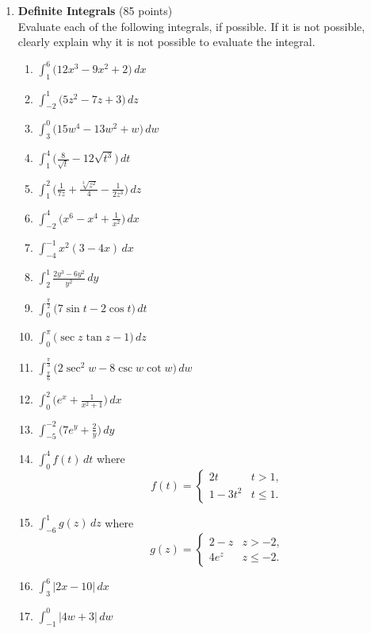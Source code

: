 \begin{enumerate}
  \newpage
  \item \textbf{Definite Integrals} (85 points)\\
  Evaluate each of the following integrals, if possible. If it is not possible, clearly explain why it is not possible to evaluate the integral.
  \begin{enumerate}
    \item $\displaystyle \int_1^6 \bigl(12 x^3 - 9 x^2 + 2\bigr) \,dx$
    \item $\displaystyle \int_{-2}^1 \bigl(5 z^2 - 7 z + 3\bigr) \,dz$
    \item $\displaystyle \int_3^0 \bigl(15 w^4 - 13 w^2 + w\bigr) \,dw$
    \item $\displaystyle \int_1^4 \biggl(\frac{8}{\sqrt{t}} - 12 \sqrt{t^3}\biggr) \,dt$
    \item $\displaystyle \int_1^2 \biggl(\frac{1}{7 z} + \frac{\sqrt[3]{z^2}}{4} - \frac{1}{2 z^3}\biggr) \,dz$
    \item $\displaystyle \int_{-2}^4 \biggl(x^6 - x^4 + \frac{1}{x^2}\biggr) \,dx$
    \item $\displaystyle \int_{-4}^{-1} x^2(3 - 4 x) \,dx$
    \item $\displaystyle \int_2^1 \frac{2 y^3 - 6 y^2}{y^2} \,dy$
    \item $\displaystyle \int_0^{\frac{\pi}{2}} \bigl(7 \sin t - 2 \cos t\bigr) \,dt$
    \item $\displaystyle \int_0^\pi \bigl(\sec z \tan z - 1\bigr) \,dz$
    \item $\displaystyle \int_{\frac{\pi}{6}}^{\frac{\pi}{3}} \bigl(2 \sec^2 w - 8 \csc w \cot w\bigr) \,dw$
    \item $\displaystyle \int_0^2 \biggl(e^x + \frac{1}{x^2 + 1}\biggr) \,dx$
    \item $\displaystyle \int_{-5}^{-2} \biggl(7 e^y + \frac{2}{y}\biggr) \,dy$
    \item $\displaystyle \int_0^4 f(t) \,dt$ where
      \[
        f(t) = \begin{cases}
          2 t & t > 1, \\
          1 - 3 t^2 & t \leq 1.
        \end{cases}
      \]
    \item $\displaystyle \int_{-6}^1 g(z) \,dz$ where
      \[
        g(z) = \begin{cases}
          2 - z & z > -2, \\
          4 e^z & z \leq -2.
        \end{cases}
      \]
    \item $\displaystyle \int_3^6 |2 x - 10| \,dx$
    \item $\displaystyle \int_{-1}^0 |4 w + 3| \,dw$
  \end{enumerate}


\end{enumerate}
